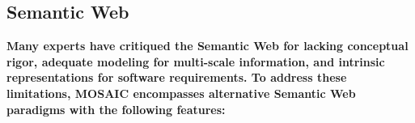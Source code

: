 \atsp
\begin{frame}{}
\section{Semantic Web}
\vspace{.5em}	


{\hspace*{-2pt}
\begin{minipage}[c]{\textwidth}\Large\centering
		\color{htxt} 	
\vspace{.1em}\textbf{%
Many experts have critiqued the Semantic Web for 
lacking conceptual rigor, adequate modeling for 
multi-scale information, and 
intrinsic representations for software 
requirements.
To address these limitations, MOSAIC encompasses 
alternative Semantic Web paradigms 
with the following features:}\end{minipage}}
\vspace{1.4em}
	

\end{frame}
